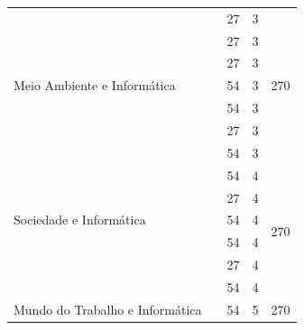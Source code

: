 \documentclass[11pt,fleqn]{book} %
\begin{document}
\begin{table}[H]
{\begin{tabular}{|l|l|c|c|c|}
			\multirow{7}{*}{Meio Ambiente e Informática}                   
			& \nameref{3_poo}                                  & 27                         &  3                & \multirow{7}{*}{270} \\ \cline{2-4}
			& \nameref{3_nosql}                                & 27                         &  3                &                      \\ \cline{2-4}			
			& \nameref{3_testsoft}                             & 27                         &  3                &                      \\ \cline{2-4}
			& \nameref{3_engreq}                               & 54                         &  3                &                      \\ \cline{2-4}
			& \nameref{3_redescomp}                            & 54                         &  3                &                      \\ \cline{2-4}
			& \nameref{3_educamb}                              & 27                         &  3                &                      \\ \cline{2-4}
			& \nameref{3_projamb}                              & 54                         &  3                &                      \\ \hline
			\multirow{5}{*}{Sociedade e Informática}                        
			& \nameref{4_ppw1}                                 & 54                         &  4                & \multirow{6}{*}{270} \\ \cline{2-4}
			& \nameref{4_ihc}                                  & 27                         &  4                &                      \\ \cline{2-4}
			& \nameref{4_asi}                                  & 54                         &  4                &                      \\ \cline{2-4}
			& \nameref{4_probest}                              & 54                         &  4                &                      \\ \cline{2-4}
			& \nameref{4_etnicoraciais}                        & 27                         &  4                &                      \\ \cline{2-4}
			& \nameref{4_projsoc}                              & 54                         &  4                &                      \\ \hline
			\multirow{6}{*}{Mundo do Trabalho e Informática}                          
     		& \nameref{5_ppw2}                                & 54                         &  5                & \multirow{6}{*}{270} \\ \cline{2-4}

\end{tabular}}
\end{table}
\end{document}
